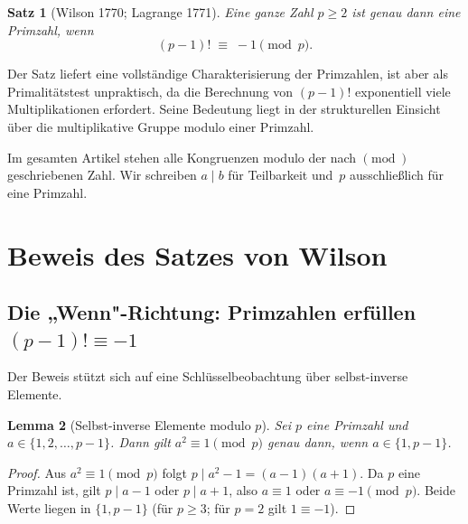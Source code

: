 \documentclass[12pt,a4paper]{amsart}
\newtheorem{theorem}{Satz}[section]
\newtheorem{lemma}[theorem]{Lemma}
\theoremstyle{definition}
\begin{document}
\begin{theorem}[Wilson 1770; Lagrange 1771]\label{satz:wilson}
  Eine ganze Zahl $p \geq 2$ ist genau dann eine Primzahl, wenn
  \[
    (p-1)! \;\equiv\; -1 \pmod{p}.
  \]
\end{theorem}

Der Satz liefert eine vollständige Charakterisierung der Primzahlen,
ist aber als Primalitätstest unpraktisch, da die Berechnung von $(p-1)!$
exponentiell viele Multiplikationen erfordert.
Seine Bedeutung liegt in der strukturellen Einsicht über die
multiplikative Gruppe modulo einer Primzahl.

Im gesamten Artikel stehen alle Kongruenzen modulo der nach $\pmod{}$
geschriebenen Zahl. Wir schreiben $a \mid b$ für Teilbarkeit und~$p$
ausschließlich für eine Primzahl.

\section{Beweis des Satzes von Wilson}

\subsection{Die „Wenn"-Richtung: Primzahlen erfüllen $(p-1)! \equiv -1$}

Der Beweis stützt sich auf eine Schlüsselbeobachtung über selbst-inverse
Elemente.

\begin{lemma}[Selbst-inverse Elemente modulo $p$]\label{lem:selbstinvers}
  Sei $p$ eine Primzahl und $a \in \{1, 2, \ldots, p-1\}$.
  Dann gilt $a^2 \equiv 1 \pmod{p}$ genau dann, wenn $a \in \{1, p-1\}$.
\end{lemma}

\begin{proof}
  Aus $a^2 \equiv 1 \pmod{p}$ folgt $p \mid a^2 - 1 = (a-1)(a+1)$.
  Da $p$ eine Primzahl ist, gilt $p \mid a-1$ oder $p \mid a+1$,
  also $a \equiv 1$ oder $a \equiv -1 \pmod{p}$.
  Beide Werte liegen in $\{1, p-1\}$ (für $p \geq 3$;
  für $p = 2$ gilt $1 \equiv -1$).
\end{proof}
\end{document}
